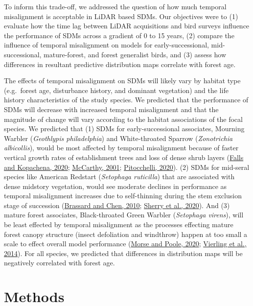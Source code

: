 \documentclass[
  12pt,
]{article}
\begin{document}
To inform this trade-off, we addressed the question of how much temporal misalignment is acceptable in LiDAR based SDMs. Our objectives were to (1) evaluate how the time lag between LiDAR acquisitions and bird surveys influence the performance of SDMs across a gradient of 0 to 15 years, (2) compare the influence of temporal misalignment on models for early-successional, mid-successional, mature-forest, and forest generalist birds, and (3) assess how differences in resultant predictive distribution maps correlate with forest age.

The effects of temporal misalignment on SDMs will likely vary by habitat type (e.g.~forest age, disturbance history, and dominant vegetation) and the life history characteristics of the study species. We predicted that the performance of SDMs will decrease with increased temporal misalignment and that the magnitude of change will vary according to the habitat associations of the focal species. We predicted that (1) SDMs for early-successional associates, Mourning Warbler (\emph{Geothlypis philadelphia}) and White-throated Sparrow (\emph{Zonotrichia albicollis}), would be most affected by temporal misalignment because of faster vertical growth rates of establishment trees and loss of dense shrub layers (\protect\hyperlink{ref-fallsWhitethroatedSparrowZonotrichia2020}{Falls and Kopachena, 2020}; \protect\hyperlink{ref-mccarthy2001gap}{McCarthy, 2001}; \protect\hyperlink{ref-pitocchelliMourningWarblerGeothlypis2020}{Pitocchelli, 2020}). (2) SDMs for mid-seral species like American Redstart (\emph{Setophaga ruticilla}) that are associated with dense midstory vegetation, would see moderate declines in performance as temporal misalignment increases due to self-thinning during the stem exclusion stage of succession (\protect\hyperlink{ref-brassardStandStructureComposition2010}{Brassard and Chen, 2010}; \protect\hyperlink{ref-sherryAmericanRedstartSetophaga2020a}{Sherry et al., 2020}). And (3) mature forest associates, Black-throated Green Warbler (\emph{Setophaga virens}), will be least effected by temporal misalignment as the processes effecting mature forest canopy structure (insect defoliation and windthrow) happen at too small a scale to effect overall model performance (\protect\hyperlink{ref-morseBlackthroatedGreenWarbler2020a}{Morse and Poole, 2020}; \protect\hyperlink{ref-VierlingSwift2014}{Vierling et al., 2014}). For all species, we predicted that differences in distribution maps will be negatively correlated with forest age.

\hypertarget{methods}{%
\section{Methods}\label{methods}}
\end{document}
